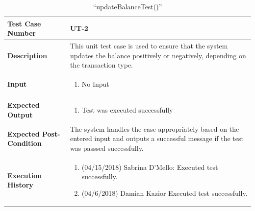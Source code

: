 \documentclass[12pt]{article}
\begin{document}
\begin{table}[H]
\caption{“updateBalanceTest()”}
\begin{center}
\begin{tabular}{|p{5.5cm}|p{11cm}|}
  \hline
  \bf Test Case Number & UT-2\\\hline
  \bf Description & 
  This unit test case is used to ensure that the system updates the balance positively or negatively, depending on the transaction type.\\\hline
  \bf Input &
  \begin{enumerate}
  \item No Input
  \end{enumerate}
  \\\hline
  \bf Expected Output &
  \begin{enumerate}
  \item Test was executed successfully
  \end{enumerate}
  \\\hline
  \bf Expected Post-Condition & 
  The system handles the case appropriately based on the entered input and outputs a successful message if the test was passsed successfully.
  \\\hline   
  \bf Execution History & 
  \begin{enumerate}
  \item (04/15/2018) Sabrina D’Mello: Executed test successfully.
  \item (04/6/2018) Damian Kazior Executed test successfully.
  \end{enumerate}
  \\\hline
\end{tabular}
\end{center}
\end{table}
\end{document}
